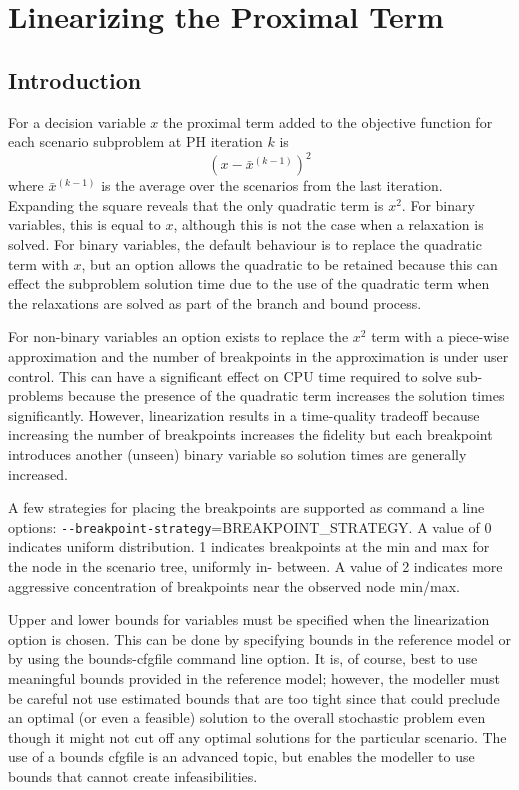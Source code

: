 \section{Linearizing the Proximal Term \label{LinearSec}}

\subsection{Introduction}

For a decision variable $x$ the proximal term added to the objective function
for each scenario subproblem at PH iteration $k$ is
$$
\left(x - \bar{x}^{(k-1)}\right)^{2}
$$
where $\bar{x}^{(k-1)}$ is the average over the scenarios from the last
iteration. Expanding the square reveals that the only quadratic term is $x^{2}$.
For binary variables, this is equal to $x$, although this is not the case when a
relaxation is solved. For binary variables, the default behaviour is to replace
the quadratic term with $x$, but an option allows the quadratic to be retained
because this can effect the subproblem solution time due to the use of the
quadratic term when the relaxations are solved as part of the branch and bound
process.

For non-binary variables an option exists to replace the $x^2$ term with a
piece-wise approximation and the number of breakpoints in the approximation is
under user control. This can have a significant effect on CPU time required to
solve sub-problems because the presence of the quadratic term increases the
solution times significantly. However, linearization results in a time-quality
tradeoff because increasing the number of breakpoints increases the fidelity but
each breakpoint introduces another (unseen) binary variable so solution times
are generally increased.

A few strategies for placing the breakpoints are supported as command a line
options: \verb|--breakpoint-strategy|=BREAKPOINT\_STRATEGY. A value of 0
indicates uniform distribution. 1 indicates breakpoints at the min and max for
the node in the scenario tree, uniformly in- between. A value of 2 indicates
more aggressive concentration of breakpoints near the observed node min/max.

Upper and lower bounds for variables must be specified when the linearization
option is chosen. This can be done by specifying bounds in the reference model
or by using the bounds-cfgfile command line option. It is, of course, best to
use meaningful bounds provided in the reference model; however, the modeller
must be careful not use estimated bounds that are too tight since that could
preclude an optimal (or even a feasible) solution to the overall stochastic
problem even though it might not cut off any optimal solutions for the
particular scenario. The use of a bounds cfgfile is an advanced topic, but
enables the modeller to use bounds that cannot create infeasibilities.


